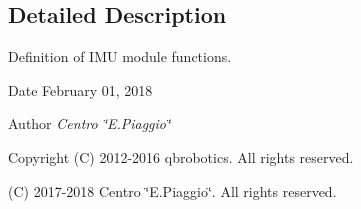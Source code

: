 \subsection{Detailed Description}
Definition of I\+MU module functions. 

\begin{DoxyDate}{Date}
February 01, 2018 
\end{DoxyDate}
\begin{DoxyAuthor}{Author}
{\itshape Centro \char`\"{}\+E.\+Piaggio\char`\"{}} 
\end{DoxyAuthor}
\begin{DoxyCopyright}{Copyright}
(C) 2012-\/2016 qbrobotics. All rights reserved. 

(C) 2017-\/2018 Centro \char`\"{}\+E.\+Piaggio\char`\"{}. All rights reserved. 
\end{DoxyCopyright}
